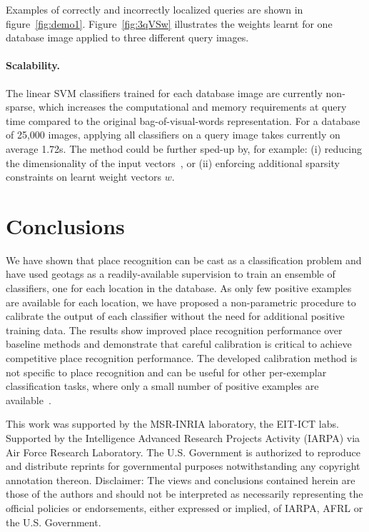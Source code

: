       Examples of correctly and incorrectly localized queries are shown in figure~\ref{fig:demo1}. Figure~\ref{fig:3qVSw} illustrates the weights learnt for one database image applied
      to three different query images.

   \paragraph{Scalability.}
      The linear SVM classifiers trained for each database image are currently non-sparse,
      which increases the computational and memory requirements
      at query time compared to the original bag-of-visual-words representation.
      For a database of 25,000 images, applying all classifiers on a query image takes currently on average 1.72s. The method could be further sped-up by, for example: (i) reducing the dimensionality of the input vectors~\cite{Jegou12}, or (ii) enforcing additional sparsity constraints on learnt weight vectors $w$.

   
\section{Conclusions}
   We have shown that place recognition can be cast as a classification problem and have used geotags as a readily-available supervision to train an ensemble of classifiers, one for each location in the database. As only few positive examples are available for each location, we have proposed a non-parametric procedure to calibrate the output of each classifier without the need for additional positive training data. The results show improved place recognition performance over baseline methods and demonstrate that careful calibration is critical to achieve competitive place recognition performance. The developed calibration method is not specific to place recognition and can be useful for other per-exemplar classification tasks, where only a small number of positive examples are available~\cite{Malisiewicz11}.

   \vspace*{-3mm}


\begin{acknowledgements}
   This work was supported by the MSR-INRIA laboratory, the EIT-ICT labs.
   {
   \footnotesize
   \noindent
   Supported by the Intelligence Advanced Research Projects Activity (IARPA) via Air Force Research Laboratory. The U.S. Government is authorized to reproduce and distribute reprints for governmental purposes notwithstanding any copyright annotation thereon. Disclaimer:  The views and conclusions contained herein are those of the authors and should not be interpreted as necessarily representing the official policies or endorsements, either expressed or implied, of IARPA, AFRL or the U.S. Government.
   }
\end{acknowledgements}

